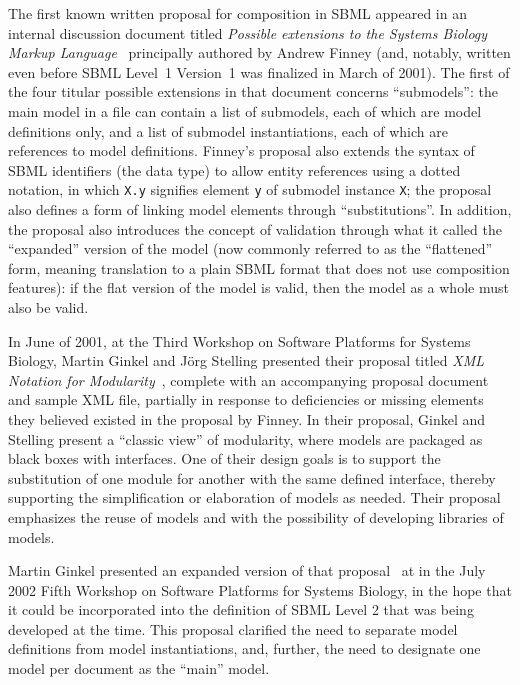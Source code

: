 The first known written proposal for composition in SBML appeared in an
internal discussion document titled \emph{Possible extensions to the
  Systems Biology Markup Language}~\citep{finney:2000} principally authored by
Andrew Finney (and, notably, written even before SBML Level~1 Version~1
was finalized in March of 2001).  The first of the four titular possible
extensions in that document concerns ``submodels'': the main model in a
file can contain a list of submodels, each of which are model
definitions only, and a list of submodel instantiations, each of which
are references to model definitions.  Finney's proposal also
extends the syntax of SBML identifiers (the  data type) to
allow entity references using a dotted notation, in which \texttt{X.y}
signifies element \texttt{y} of submodel instance \texttt{X}; the
proposal also defines a form of linking model elements through
``substitutions''.  In addition, the proposal also introduces the
concept of validation through what it called the ``expanded'' version of
the model (now commonly referred to as the ``flattened'' form, meaning
translation to a plain SBML format that does not use composition
features): if the flat version of the model is valid, then the model as
a whole must also be valid.

In June of 2001, at the Third Workshop on Software Platforms for Systems
Biology, Martin Ginkel and J\"{o}rg Stelling presented their proposal
titled \emph{XML Notation for Modularity}~\citep{ginkel:2001}, complete with an
accompanying proposal document and sample XML file, partially in
response to deficiencies or missing elements they believed existed in
the proposal by Finney.  In their proposal, Ginkel and Stelling present
a ``classic view'' of modularity, where models are packaged as black
boxes with interfaces.  One of their design goals is to support the
substitution of one module for another with the same defined interface,
thereby supporting the simplification or elaboration of models as
needed.  Their proposal emphasizes the reuse of models and with the
possibility of developing libraries of models.

Martin Ginkel presented an expanded version of that proposal~\citep{ginkel:2002} at
in the July 2002 Fifth Workshop on Software Platforms for Systems
Biology, in the hope that it could be incorporated into the definition
of SBML Level 2 that was being developed at the time.  This proposal
clarified the need to separate model definitions from model
instantiations, and, further, the need to designate one model per
document as the ``main'' model.

